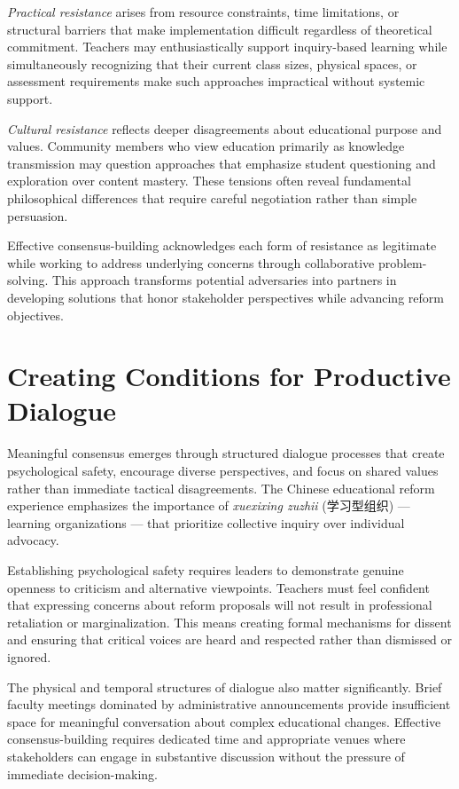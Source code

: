 \documentclass[
  Letterpaper,
]{scrbook}
\begin{document}
\emph{Practical resistance} arises from resource constraints, time
limitations, or structural barriers that make implementation difficult
regardless of theoretical commitment. Teachers may enthusiastically
support inquiry-based learning while simultaneously recognizing that
their current class sizes, physical spaces, or assessment requirements
make such approaches impractical without systemic support.

\emph{Cultural resistance} reflects deeper disagreements about
educational purpose and values. Community members who view education
primarily as knowledge transmission may question approaches that
emphasize student questioning and exploration over content mastery.
These tensions often reveal fundamental philosophical differences that
require careful negotiation rather than simple persuasion.

Effective consensus-building acknowledges each form of resistance as
legitimate while working to address underlying concerns through
collaborative problem-solving. This approach transforms potential
adversaries into partners in developing solutions that honor stakeholder
perspectives while advancing reform objectives.

\section{Creating Conditions for Productive
Dialogue}\label{creating-conditions-for-productive-dialogue}

Meaningful consensus emerges through structured dialogue processes that
create psychological safety, encourage diverse perspectives, and focus
on shared values rather than immediate tactical disagreements. The
Chinese educational reform experience emphasizes the importance of
\emph{xuexixing zuzhii} (学习型组织) --- learning organizations --- that
prioritize collective inquiry over individual advocacy.

Establishing psychological safety requires leaders to demonstrate
genuine openness to criticism and alternative viewpoints. Teachers must
feel confident that expressing concerns about reform proposals will not
result in professional retaliation or marginalization. This means
creating formal mechanisms for dissent and ensuring that critical voices
are heard and respected rather than dismissed or ignored.

The physical and temporal structures of dialogue also matter
significantly. Brief faculty meetings dominated by administrative
announcements provide insufficient space for meaningful conversation
about complex educational changes. Effective consensus-building requires
dedicated time and appropriate venues where stakeholders can engage in
substantive discussion without the pressure of immediate
decision-making.
\end{document}

